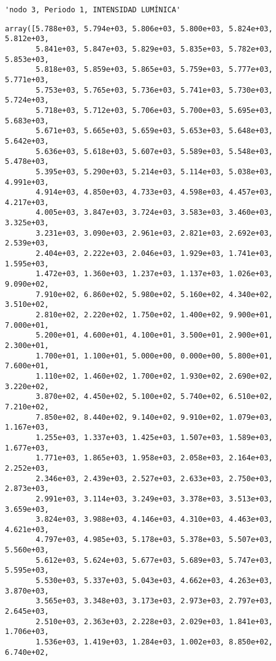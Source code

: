 \documentclass[11pt]{article}
\begin{document}
    
    
    \begin{verbatim}
'nodo 3, Periodo 1, INTENSIDAD LUMÍNICA'
    \end{verbatim}

    
    
    \begin{verbatim}
array([5.788e+03, 5.794e+03, 5.806e+03, 5.800e+03, 5.824e+03, 5.812e+03,
       5.841e+03, 5.847e+03, 5.829e+03, 5.835e+03, 5.782e+03, 5.853e+03,
       5.818e+03, 5.859e+03, 5.865e+03, 5.759e+03, 5.777e+03, 5.771e+03,
       5.753e+03, 5.765e+03, 5.736e+03, 5.741e+03, 5.730e+03, 5.724e+03,
       5.718e+03, 5.712e+03, 5.706e+03, 5.700e+03, 5.695e+03, 5.683e+03,
       5.671e+03, 5.665e+03, 5.659e+03, 5.653e+03, 5.648e+03, 5.642e+03,
       5.636e+03, 5.618e+03, 5.607e+03, 5.589e+03, 5.548e+03, 5.478e+03,
       5.395e+03, 5.290e+03, 5.214e+03, 5.114e+03, 5.038e+03, 4.991e+03,
       4.914e+03, 4.850e+03, 4.733e+03, 4.598e+03, 4.457e+03, 4.217e+03,
       4.005e+03, 3.847e+03, 3.724e+03, 3.583e+03, 3.460e+03, 3.325e+03,
       3.231e+03, 3.090e+03, 2.961e+03, 2.821e+03, 2.692e+03, 2.539e+03,
       2.404e+03, 2.222e+03, 2.046e+03, 1.929e+03, 1.741e+03, 1.595e+03,
       1.472e+03, 1.360e+03, 1.237e+03, 1.137e+03, 1.026e+03, 9.090e+02,
       7.910e+02, 6.860e+02, 5.980e+02, 5.160e+02, 4.340e+02, 3.510e+02,
       2.810e+02, 2.220e+02, 1.750e+02, 1.400e+02, 9.900e+01, 7.000e+01,
       5.200e+01, 4.600e+01, 4.100e+01, 3.500e+01, 2.900e+01, 2.300e+01,
       1.700e+01, 1.100e+01, 5.000e+00, 0.000e+00, 5.800e+01, 7.600e+01,
       1.110e+02, 1.460e+02, 1.700e+02, 1.930e+02, 2.690e+02, 3.220e+02,
       3.870e+02, 4.450e+02, 5.100e+02, 5.740e+02, 6.510e+02, 7.210e+02,
       7.850e+02, 8.440e+02, 9.140e+02, 9.910e+02, 1.079e+03, 1.167e+03,
       1.255e+03, 1.337e+03, 1.425e+03, 1.507e+03, 1.589e+03, 1.677e+03,
       1.771e+03, 1.865e+03, 1.958e+03, 2.058e+03, 2.164e+03, 2.252e+03,
       2.346e+03, 2.439e+03, 2.527e+03, 2.633e+03, 2.750e+03, 2.873e+03,
       2.991e+03, 3.114e+03, 3.249e+03, 3.378e+03, 3.513e+03, 3.659e+03,
       3.824e+03, 3.988e+03, 4.146e+03, 4.310e+03, 4.463e+03, 4.621e+03,
       4.797e+03, 4.985e+03, 5.178e+03, 5.378e+03, 5.507e+03, 5.560e+03,
       5.612e+03, 5.624e+03, 5.677e+03, 5.689e+03, 5.747e+03, 5.595e+03,
       5.530e+03, 5.337e+03, 5.043e+03, 4.662e+03, 4.263e+03, 3.870e+03,
       3.565e+03, 3.348e+03, 3.173e+03, 2.973e+03, 2.797e+03, 2.645e+03,
       2.510e+03, 2.363e+03, 2.228e+03, 2.029e+03, 1.841e+03, 1.706e+03,
       1.536e+03, 1.419e+03, 1.284e+03, 1.002e+03, 8.850e+02, 6.740e+02,

\end{verbatim}
\end{document}
